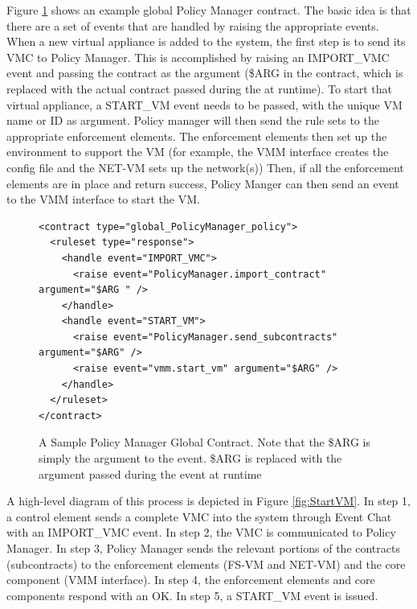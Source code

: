 Figure \ref{lst:PolicyManager_global} shows an example global Policy Manager contract. The basic idea is that there are a set of events that are handled by raising the appropriate events. When a new virtual appliance is added to the system, the first step is to send its VMC to Policy Manager. This is accomplished by raising an IMPORT\_VMC event and passing the contract as the argument (\$ARG in the contract, which is replaced with the actual contract passed during the at runtime). To start that virtual appliance, a START\_VM event needs to be passed, with the unique VM name or ID as argument. Policy manager will then send the rule sets to the appropriate enforcement elements. The enforcement elements then set up the environment to support the VM (for example, the VMM interface creates the config file and the NET-VM sets up the network(s)) Then, if all the enforcement elements are in place and return success, Policy Manger can then send an event to the VMM interface to start the VM. 

\begin{figure}[tbp]
\caption{A Sample Policy Manager Global Contract. Note that the \$ARG is simply the argument to the event. \$ARG is replaced with the argument passed during the event at runtime}
\label{lst:PolicyManager_global}
\begin{lstlisting}
<contract type="global_PolicyManager_policy">
  <ruleset type="response">
    <handle event="IMPORT_VMC">
      <raise event="PolicyManager.import_contract" argument="$ARG " />
    </handle>
    <handle event="START_VM">
      <raise event="PolicyManager.send_subcontracts" argument="$ARG" />
      <raise event="vmm.start_vm" argument="$ARG" />
    </handle>
  </ruleset>
</contract>
\end{lstlisting}
\end{figure}


A high-level diagram of this process is depicted in Figure \ref{fig:StartVM}. In step 1, a control element sends a complete VMC into the system through Event Chat with an IMPORT\_VMC event. In step 2, the VMC is communicated to Policy Manager. In step 3, Policy Manager sends the relevant portions of the contracts (subcontracts) to the enforcement elements (FS-VM and NET-VM) and the core component (VMM interface). In step 4, the enforcement elements and core components respond with an OK. In step 5, a START\_VM event is issued.

